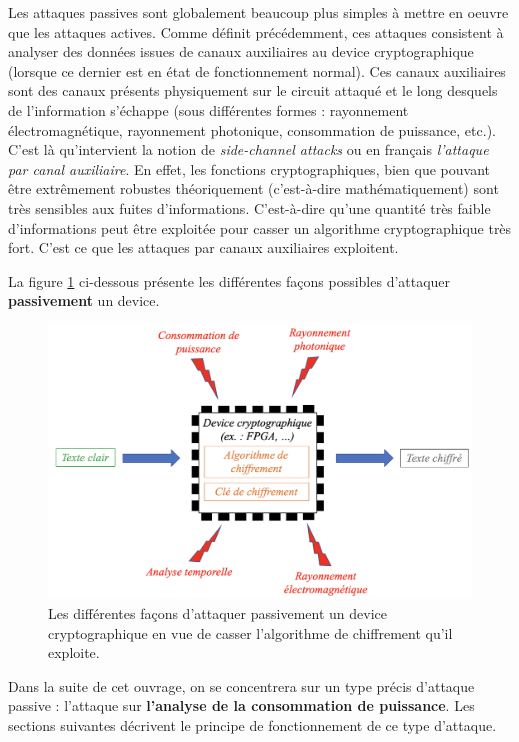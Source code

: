 \documentclass[oneside]{book}
\begin{document}
\vspace{-0.25 cm}Les attaques passives sont globalement beaucoup plus simples à mettre en oeuvre que les attaques actives. Comme définit précédemment, ces attaques consistent à analyser des données issues de canaux auxiliaires au device cryptographique (lorsque ce dernier est en état de fonctionnement normal). Ces canaux auxiliaires sont des canaux présents physiquement sur le circuit attaqué et le long desquels de l’information s’échappe (sous différentes formes : rayonnement électromagnétique, rayonnement photonique, consommation de puissance, etc.). C'est là qu'intervient la notion de \textit{side-channel attacks} ou en français \textit{l'attaque par canal auxiliaire}. 
En effet, les fonctions cryptographiques, bien que pouvant être extrêmement robustes théoriquement (c'est-à-dire mathématiquement) sont très sensibles aux fuites d’informations. C'est-à-dire qu'une quantité très faible d’informations peut être exploitée pour casser un algorithme cryptographique très fort. C’est ce que les attaques par canaux auxiliaires exploitent. 

\hspace{-0.5 cm}La figure \ref{fig:attackpassive} ci-dessous présente les différentes façons possibles d'attaquer \textbf{passivement} un device.
\begin{figure}[htbp]
    \centering
    \includegraphics[scale=0.4]{image/attackpassive}
    \caption{Les différentes façons d'attaquer passivement un device cryptographique en vue de casser l'algorithme de chiffrement qu'il exploite.}
    \label{fig:attackpassive}
\end{figure}

Dans la suite de cet ouvrage, on se concentrera sur un type précis d'attaque passive : l'attaque sur \textbf{l'analyse de la consommation de puissance}. Les sections suivantes décrivent le principe de fonctionnement de ce type d'attaque. 
\end{document}
